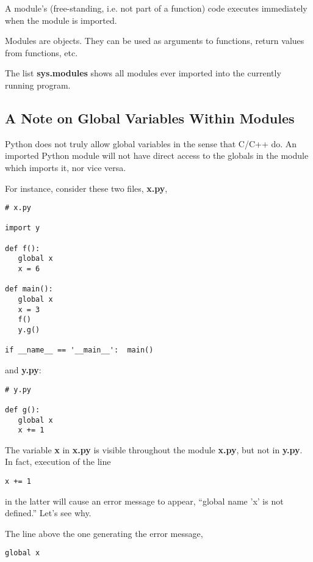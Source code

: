 A module's (free-standing, i.e. not part of a function) code executes
immediately when the module is imported.

Modules are objects.  They can be used as arguments to functions, return
values from functions, etc.

The list {\bf sys.modules} shows all modules ever imported into the
currently running program.

\subsection{A Note on Global Variables Within Modules}
\label{unctuous}

Python does not truly allow global variables in the sense that C/C++ do.
An imported Python module will not have direct access to the globals in
the module which imports it, nor vice versa.  

For instance, consider these two files, {\bf x.py},

\begin{Verbatim}[fontsize=\relsize{-2}]
# x.py

import y

def f():
   global x
   x = 6

def main():
   global x
   x = 3
   f()
   y.g()

if __name__ == '__main__':  main()
\end{Verbatim}

and {\bf y.py}:

\begin{Verbatim}[fontsize=\relsize{-2}]
# y.py

def g():
   global x
   x += 1
\end{Verbatim}

The variable {\bf x} in {\bf x.py} is visible throughout the module {\bf
x.py}, but not in {\bf y.py}.  In fact, execution of the line

\begin{Verbatim}[fontsize=\relsize{-2}]
   x += 1
\end{Verbatim}

in the latter will cause an error message to appear, ``global name 'x'
is not defined.''  Let's see why.

The line above the one generating the error message,

\begin{Verbatim}[fontsize=\relsize{-2}]
   global x
\end{Verbatim}

